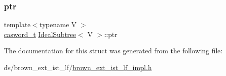 \subsubsection{\texorpdfstring{ptr}{ptr}}
{\footnotesize\ttfamily template$<$typename V $>$ \\
\hyperlink{rq__unsafe_8h_ad45142aaf2ff20a036dc6242b8483e9c}{casword\+\_\+t} \hyperlink{structIdealSubtree}{Ideal\+Subtree}$<$ V $>$\+::ptr}



The documentation for this struct was generated from the following file\+:\begin{DoxyCompactItemize}
\item 
ds/brown\+\_\+ext\+\_\+ist\+\_\+lf/\hyperlink{brown__ext__ist__lf__impl_8h}{brown\+\_\+ext\+\_\+ist\+\_\+lf\+\_\+impl.\+h}\end{DoxyCompactItemize}
